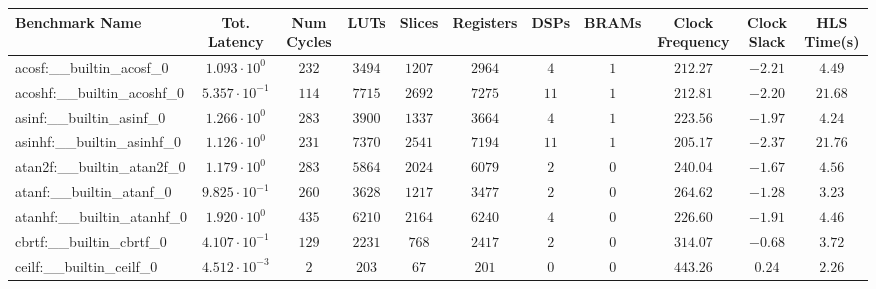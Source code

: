 \begin{tabular}{|l|c|c|c|c|c|c|c|c|c|c|}
\hline
Benchmark Name                            & Tot. Latency            & Num Cycles & LUTs       & Slices    & Registers  & DSPs    & BRAMs & Clock Frequency & Clock Slack & HLS Time(s) \\
\hline
acosf:\_\_builtin\_acosf\_0               & $ 1.093 \cdot 10^{0}  $ & $ 232    $ & $ 3494   $ & $ 1207  $ & $ 2964   $ & $ 4   $ & $ 1 $ & $ 212.27      $ & $ -2.21   $ & $ 4.49    $ \\
acoshf:\_\_builtin\_acoshf\_0             & $ 5.357 \cdot 10^{-1} $ & $ 114    $ & $ 7715   $ & $ 2692  $ & $ 7275   $ & $ 11  $ & $ 1 $ & $ 212.81      $ & $ -2.20   $ & $ 21.68   $ \\
asinf:\_\_builtin\_asinf\_0               & $ 1.266 \cdot 10^{0}  $ & $ 283    $ & $ 3900   $ & $ 1337  $ & $ 3664   $ & $ 4   $ & $ 1 $ & $ 223.56      $ & $ -1.97   $ & $ 4.24    $ \\
asinhf:\_\_builtin\_asinhf\_0             & $ 1.126 \cdot 10^{0}  $ & $ 231    $ & $ 7370   $ & $ 2541  $ & $ 7194   $ & $ 11  $ & $ 1 $ & $ 205.17      $ & $ -2.37   $ & $ 21.76   $ \\
atan2f:\_\_builtin\_atan2f\_0             & $ 1.179 \cdot 10^{0}  $ & $ 283    $ & $ 5864   $ & $ 2024  $ & $ 6079   $ & $ 2   $ & $ 0 $ & $ 240.04      $ & $ -1.67   $ & $ 4.56    $ \\
atanf:\_\_builtin\_atanf\_0               & $ 9.825 \cdot 10^{-1} $ & $ 260    $ & $ 3628   $ & $ 1217  $ & $ 3477   $ & $ 2   $ & $ 0 $ & $ 264.62      $ & $ -1.28   $ & $ 3.23    $ \\
atanhf:\_\_builtin\_atanhf\_0             & $ 1.920 \cdot 10^{0}  $ & $ 435    $ & $ 6210   $ & $ 2164  $ & $ 6240   $ & $ 4   $ & $ 0 $ & $ 226.60      $ & $ -1.91   $ & $ 4.46    $ \\
cbrtf:\_\_builtin\_cbrtf\_0               & $ 4.107 \cdot 10^{-1} $ & $ 129    $ & $ 2231   $ & $ 768   $ & $ 2417   $ & $ 2   $ & $ 0 $ & $ 314.07      $ & $ -0.68   $ & $ 3.72    $ \\
ceilf:\_\_builtin\_ceilf\_0               & $ 4.512 \cdot 10^{-3} $ & $ 2      $ & $ 203    $ & $ 67    $ & $ 201    $ & $ 0   $ & $ 0 $ & $ 443.26      $ & $ 0.24    $ & $ 2.26    $ \\

\end{tabular}

